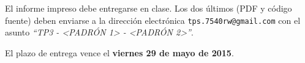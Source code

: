 \documentclass[12pt,spanish,]{article}
\begin{document}
El informe impreso debe entregarse en clase. Los dos últimos (PDF y
código fuente) deben enviarse a la dirección electrónica
\texttt{tps.7540rw@gmail.com} con el asunto \emph{``TP3 -
\textless{}PADRÓN 1\textgreater{} - \textless{}PADRÓN
2\textgreater{}''}.

El plazo de entrega vence el \textbf{viernes 29 de mayo de 2015}.
\end{document}
